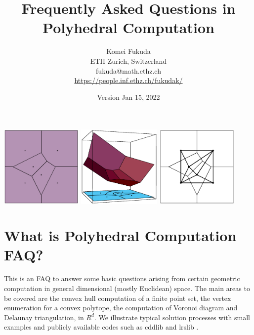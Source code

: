 \documentclass[a4paper,12pt]{article}
\title
{Frequently Asked Questions in Polyhedral Computation}
\author
{{Komei Fukuda}\\
   ETH Zurich, Switzerland\\
    fukuda@math.ethz.ch\\
    \url{https://people.inf.ethz.ch/fukudak/}
}
\date{Version Jan 15, 2022}
\begin{document}
\maketitle

\begin{center}
\includegraphics[height=40mm]{vtest_fig_vo.eps}
\includegraphics[height=40mm]{vtest_fig_vo3d.eps}
\includegraphics[height=40mm]{vtest_fig_vode.eps}
\end{center}

\tableofcontents


\section{What is Polyhedral Computation FAQ?}  \label{Sec:intro}

This is an FAQ to answer some basic questions arising from
certain geometric computation in general dimensional 
(mostly Euclidean) space.   The main areas to be covered
are the convex hull computation of a finite point set, 
the vertex enumeration for a convex polytope,
the computation of Voronoi diagram and Delaunay triangulation, in $R^d$.
We illustrate typical solution processes with small examples and
publicly available codes such as cddlib \cite{f-cddhome}  and lrslib \cite{a-lrshome-01}.
\end{document}
